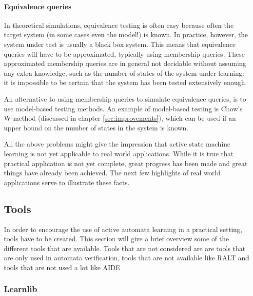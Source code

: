 \documentclass[multi,crop=false,class=article]{standalone}
\begin{document}
\paragraph{Equivalence queries} In theoretical simulations, equivalence testing
is often easy because often the target system (in some cases even the model!) is
known. In practice, however, the system under test is usually a black box
system. This means that equivalence queries will have to be approximated,
typically using membership queries. These approximated membership queries are in
general not decidable without assuming any extra knowledge\cite{Steffen11a},
such as the number of states of the system under learning: it is impossible to
be certain that the system has been tested extensively enough.

An alternative to using membership queries to simulate equivalence queries, is
to use model-based testing methods\cite{Broy05, Tretmans11}. An example of
model-based testing is Chow's W-method\cite{Chow78} (discussed in chapter
\cref{sec:improvements}), which can be used if an upper bound on the number of
states in the system is known.


All the above problems might give the impression that active state machine
learning is not yet applicable to real world applications. While it is true that
practical application is not yet complete, great progress has been made and
great things have already been achieved. The next few highlights of real world
applications serve to illustrate these facts.

\subsection{Tools}
\label{ssec:tools}

In order to encourage the use of active automata learning in a practical
setting, tools have to be created. This section will give a brief overview some
of the different tools that are available. Tools that are not considered are
are tools that are only used in automata verification, tools that are not
available like RALT \cite{Shahbaz:2014:ATB:2858086.2858089} and tools that are
not used a lot like AIDE \cite{Cicala2016}

\subsubsection{Learnlib}
\label{sssec:learnlib}
\end{document}
